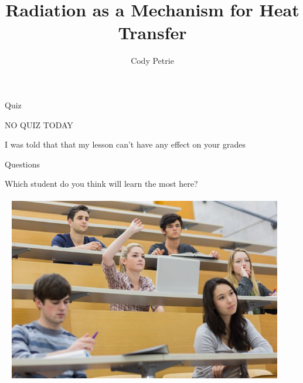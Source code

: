 \documentclass{beamer}
\title[{\color{white}{Heat Transfer - Radiation}}]{Radiation as a Mechanism for Heat Transfer}
\author{Cody Petrie}
\institute{Southern Utah University}
\date{}
\begin{document}
\begin{frame}
\titlepage
\end{frame}



\begin{frame}{Quiz}
\begin{center}
{\Large NO QUIZ TODAY}
\end{center}
I was told that that my lesson can't have any effect on your grades
\end{frame}

\begin{frame}{Questions}
\begin{center}
   Which student do you think will learn the most here?
   ~\\~\\~
   \includegraphics[width=0.9\textwidth]{figures/asking_questions.jpg}
\end{center}
\end{frame}
\end{document}
